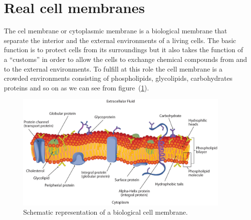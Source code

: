 \section{Real cell membranes}
The cel membrane or cytoplasmic membrane is a biological membrane that separate the interior and the external environments of a living cells. The basic function is to protect cells from its surroundings but it also takes the function of a ``customs'' in order to allow the cells to exchange chemical compounds from and to the external environments. To fulfill at this role the cell membrane is a crowded environments consisting of phospholipids, glycolipids, carbohydrates proteins and so on as we can see from figure~(\ref{fig:cellMembrane}).
\begin{figure}[!ht]
	\centering
	\includegraphics[width=0.95\textwidth]{./img/cellMembrane}
	\caption{Schematic representation of a biological cell membrane.}
	\label{fig:cellMembrane}
\end{figure}

